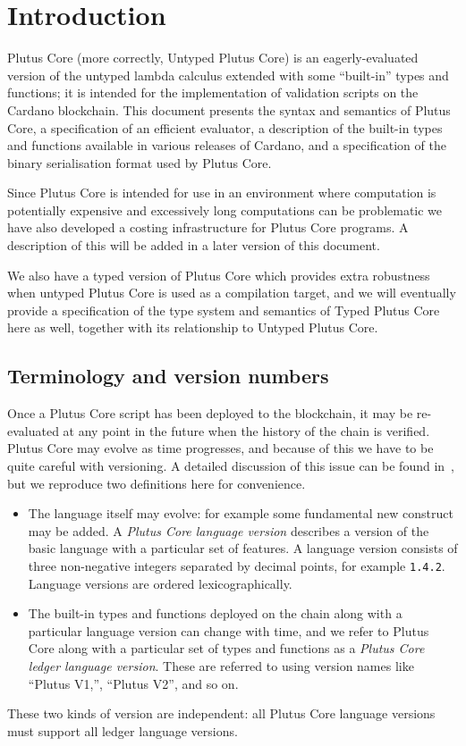 \section{Introduction}
\label{sec:introduction}
Plutus Core (more correctly, Untyped Plutus Core) is an eagerly-evaluated
version of the untyped lambda calculus extended with some ``built-in'' types and
functions; it is intended for the implementation of validation scripts on the
Cardano blockchain.  This document presents the syntax and semantics of Plutus
Core, a specification of an efficient evaluator, a description of the built-in
types and functions available in various releases of Cardano, and
a specification of the binary serialisation format used by Plutus Core.

Since Plutus Core is intended for use in an environment where
computation is potentially expensive and excessively long computations can be
problematic we have also developed a costing infrastructure for Plutus Core
programs. A description of this will be added in a later version of this
document.

We also have a typed version of Plutus Core which provides extra robustness when
untyped Plutus Core is used as a compilation target, and we will eventually
provide a specification of the type system and semantics of Typed Plutus Core
here as well, together with its relationship to Untyped Plutus Core.

\subsection{Terminology and version numbers}
\label{sec:version-numbers}
Once a Plutus Core script has been deployed to the blockchain, it may be
re-evaluated at any point in the future when the history of the chain is
verified.  Plutus Core may evolve as time progresses, and because of this we
have to be quite careful with versioning.  A detailed discussion of this issue
can be found in~\cite{CIP-35}, but we reproduce two definitions here for
convenience.
\begin{itemize}
\item The language itself may evolve: for example some fundamental new construct
  may be added.  A \textit{Plutus Core language version} describes a version of
  the basic language with a particular set of features. A language version
  consists of three non-negative integers separated by decimal points, for
  example \texttt{1.4.2}.  Language versions are ordered lexicographically.
\item The built-in types and functions deployed on the chain along with a
  particular language version can change with time, and we refer to Plutus Core
  along with a particular set of types and functions as a \textit{Plutus Core
    ledger language version}.  These are referred to using version names like
  ``Plutus V1,'', ``Plutus V2'', and so on.
  \end{itemize}
 \noindent These two kinds of version are independent: all Plutus Core language
 versions must support all ledger language versions.

